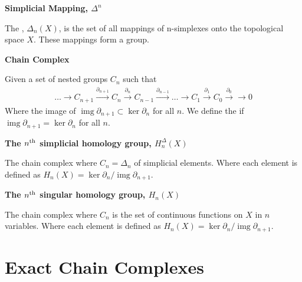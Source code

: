 \documentclass[12pt,a4paper]{report}
\newcommand{\IMG}{\operatorname{img}}
\begin{document}
\begin{description}
\item \textbf{Simplicial Mapping, $\Delta^n$}

The , $\Delta_n(X)$, is the set of all mappings of n-simplexes onto the topological space $X$.  These mappings form a group.

\item \textbf{Chain Complex}

Given a set of nested groups $C_n$ such that 
\begin{align*}
\dots \to C_{n+1} \overset{\partial_{n+1}}\longrightarrow C_{n} \overset{\partial_{n}}\longrightarrow C_{n-1} \overset{\partial_{n-1}}\longrightarrow \dots \longrightarrow C_{1} \overset{\partial_{1}}\longrightarrow C_{0} \overset{\partial_{0}}\longrightarrow \to 0
\end{align*}Where the image of $\IMG\partial_{n+1} \subset \ker \partial_n$ for all $n$.  We define the  if $\IMG\partial_{n+1} = \ker \partial_n$ for all $n$.

\item \textbf{The $n\textsuperscript{th}$ simplicial homology group, $H_n^\Delta(X)$}

The chain complex where $C_n = \Delta_n$ of simplicial elements.  Where each element is defined as $H_n(X) = \ker\partial_n/\IMG\partial_{n+1}$.

\item \textbf{The $n\textsuperscript{th}$ singular homology group, $H_n(X)$}

The chain complex where $C_n$ is the set of continuous functions on $X$ in $n$ variables.  Where each element is defined as $H_n(X) = \ker\partial_n/\IMG\partial_{n+1}$.
\end{description}

\section*{Exact Chain Complexes}
\end{document}
